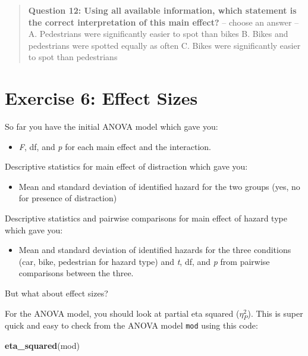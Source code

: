 \documentclass[
]{book}
\newenvironment{Shaded}{\begin{snugshade}}{\end{snugshade}}
\newcommand{\FunctionTok}[1]{\textcolor[rgb]{0.13,0.29,0.53}{\textbf{#1}}}
\newcommand{\NormalTok}[1]{#1}
\providecommand{\tightlist}{%
  \setlength{\itemsep}{0pt}\setlength{\parskip}{0pt}}
\let\oldsection\section
\renewcommand{\section}{\needspace{5\baselineskip}\oldsection}
\begin{document}
\begin{quote}
\textbf{Question 12: Using all available information, which statement is the correct interpretation of this main effect?} -- choose an answer -- A. Pedestrians were significantly easier to spot than bikes B. Bikes and pedestrians were spotted equally as often C. Bikes were significantly easier to spot than pedestrians
\end{quote}

\section{Exercise 6: Effect Sizes}\label{exercise-6-effect-sizes}

So far you have the initial ANOVA model which gave you:

\begin{itemize}
\tightlist
\item
  \emph{F}, df, and \emph{p} for each main effect and the interaction.
\end{itemize}

Descriptive statistics for main effect of distraction which gave you:

\begin{itemize}
\tightlist
\item
  Mean and standard deviation of identified hazard for the two groups (yes, no for presence of distraction)
\end{itemize}

Descriptive statistics and pairwise comparisons for main effect of hazard type which gave you:

\begin{itemize}
\tightlist
\item
  Mean and standard deviation of identified hazards for the three conditions (car, bike, pedestrian for hazard type) and \emph{t}, df, and \emph{p} from pairwise comparisons between the three.
\end{itemize}

But what about effect sizes?

For the ANOVA model, you should look at partial eta squared (\(η_P^2\)). This is super quick and easy to check from the ANOVA model \texttt{mod} using this code:

\begin{Shaded}
\begin{Highlighting}[]
\FunctionTok{eta\_squared}\NormalTok{(mod)}
\end{Highlighting}
\end{Shaded}
\end{document}
